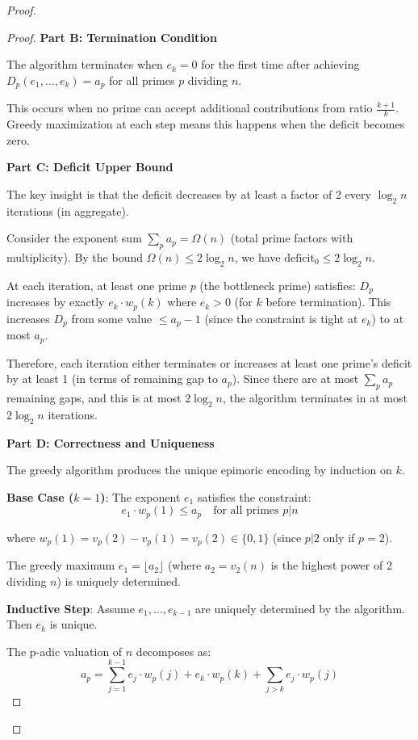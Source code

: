 \begin{proof}
\begin{theorem}
\begin{proof}
\noindent \textbf{Part B: Termination Condition}

The algorithm terminates when $e_k = 0$ for the first time after achieving $D_p(e_1, \ldots, e_k) = a_p$ for all primes $p$ dividing $n$.

This occurs when no prime can accept additional contributions from ratio $\frac{k+1}{k}$. Greedy maximization at each step means this happens when the deficit becomes zero.

\noindent \textbf{Part C: Deficit Upper Bound}

The key insight is that the deficit decreases by at least a factor of 2 every $\log_2 n$ iterations (in aggregate).

Consider the exponent sum $\sum_p a_p = \Omega(n)$ (total prime factors with multiplicity). By the bound $\Omega(n) \leq 2 \log_2 n$, we have $\text{deficit}_0 \leq 2 \log_2 n$.

At each iteration, at least one prime $p$ (the bottleneck prime) satisfies: $D_p$ increases by exactly $e_k \cdot w_p(k)$ where $e_k > 0$ (for $k$ before termination). This increases $D_p$ from some value $\leq a_p - 1$ (since the constraint is tight at $e_k$) to at most $a_p$.

Therefore, each iteration either terminates or increases at least one prime's deficit by at least 1 (in terms of remaining gap to $a_p$). Since there are at most $\sum_p a_p$ remaining gaps, and this is at most $2 \log_2 n$, the algorithm terminates in at most $2 \log_2 n$ iterations.

\noindent \textbf{Part D: Correctness and Uniqueness}

The greedy algorithm produces the unique epimoric encoding by induction on $k$.

\noindent \textbf{Base Case ($k=1$)}: The exponent $e_1$ satisfies the constraint:
\begin{equation}
e_1 \cdot w_p(1) \leq a_p \quad \text{for all primes } p | n
\end{equation}

where $w_p(1) = v_p(2) - v_p(1) = v_p(2) \in \{0, 1\}$ (since $p | 2$ only if $p = 2$).

The greedy maximum $e_1 = \lfloor a_2 \rfloor$ (where $a_2 = v_2(n)$ is the highest power of 2 dividing $n$) is uniquely determined.

\noindent \textbf{Inductive Step}: Assume $e_1, \ldots, e_{k-1}$ are uniquely determined by the algorithm. Then $e_k$ is unique.

The p-adic valuation of $n$ decomposes as:
\begin{equation}
a_p = \sum_{j=1}^{k-1} e_j \cdot w_p(j) + e_k \cdot w_p(k) + \sum_{j > k} e_j \cdot w_p(j)
\end{equation}


\end{proof}
\end{theorem}
\end{proof}
